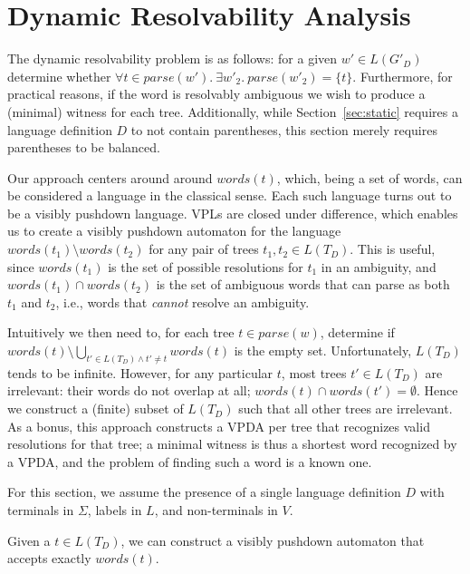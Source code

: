 \documentclass[acmsmall,review,anonymous]{acmart}\settopmatter{printfolios=true,printccs=false,printacmref=false}
\newcommand{\NT}{V} %
\newcommand{\T}{\Sigma} %
\newcommand{\Labels}{L} %
\newcommand{\parse}{\mathit{parse}} %
\newcommand{\words}{\mathit{words}} %
\begin{document}
\section{Dynamic Resolvability Analysis} \label{sec:dynamic}

The dynamic resolvability problem is as follows: for a given $w' \in L(G'_D)$ determine whether $\forall t \in \parse(w').\ \exists w'_2.\ \parse(w'_2) = \{t\}$. Furthermore, for practical reasons, if the word is resolvably ambiguous we wish to produce a (minimal) witness for each tree. Additionally, while Section~\ref{sec:static} requires a language definition $D$ to not contain parentheses, this section merely requires parentheses to be balanced.

Our approach centers around around $\words(t)$, which, being a set of words, can be considered a language in the classical sense. Each such language turns out to be a visibly pushdown language. VPLs are closed under difference, which enables us to create a visibly pushdown automaton for the language $\words(t_1) \setminus \words(t_2)$ for any pair of trees $t_1, t_2 \in L(T_D)$. This is useful, since $\words(t_1)$ is the set of possible resolutions for $t_1$ in an ambiguity, and $\words(t_1) \cap \words(t_2)$ is the set of ambiguous words that can parse as both $t_1$ and $t_2$, i.e., words that \emph{cannot} resolve an ambiguity.

Intuitively we then need to, for each tree $t \in \parse(w)$, determine if $\words(t) \setminus \bigcup_{t' \in L(T_D) \land t' \neq t} \words(t)$ is the empty set. Unfortunately, $L(T_D)$ tends to be infinite. However, for any particular $t$, most trees $t' \in L(T_D)$ are irrelevant: their words do not overlap at all; $\words(t) \cap \words(t') = \emptyset$. Hence we construct a (finite) subset of $L(T_D)$ such that all other trees are irrelevant. As a bonus, this approach constructs a VPDA per tree that recognizes valid resolutions for that tree; a minimal witness is thus a shortest word recognized by a VPDA, and the problem of finding such a word is a known one.

For this section, we assume the presence of a single language definition $D$ with terminals in $\T$, labels in $\Labels$, and non-terminals in $\NT$.

\begin{lemma}
  Given a $t \in L(T_D)$, we can construct a visibly pushdown automaton that accepts exactly $\words(t)$.
  \label{lemma:vpda-from-t}
\end{lemma}
\end{document}
